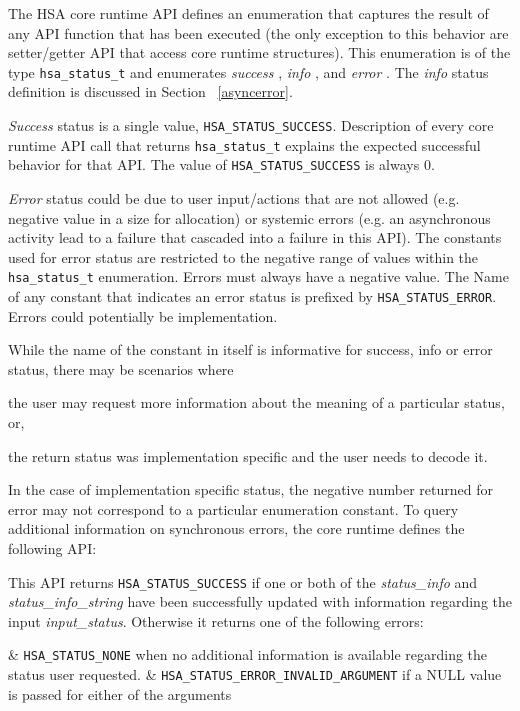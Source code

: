 \documentclass{book}
\newcommand{\diffblock}[1]{#1}
\newcommand{\emphld}[1]{\begin{DIFnomarkup} \emph{#1}
\end{DIFnomarkup}}
\newcommand{\dbtt}[1]{\diffblock{\texttt{#1}}}
\newenvironment{DIFnomarkup}{}{}
\begin{document}
The HSA core runtime API defines an enumeration that captures the
result of any API function that has been executed (the only
exception to this behavior are setter/getter API that access core
runtime structures). This enumeration is of the type
\dbtt{hsa\_status\_t} and enumerates \emphld{success},
\emphld{info}, and \emphld{error}. The \emphld{info} status definition
is discussed in Section ~\ref{asyncerror}.

\emphld{Success} status is a single value,
\dbtt{HSA\_STATUS\_SUCCESS}. Description of every core runtime
API call that returns \dbtt{hsa\_status\_t} explains the
expected successful behavior for that API. The value of
\dbtt{HSA\_STATUS\_SUCCESS} is always 0.

\emphld{Error} status could be due to user input/actions that are not
allowed (e.g. negative value in a size for allocation) or systemic
errors (e.g. an asynchronous activity lead to a failure that
cascaded into a failure in this API). The constants used for error
status are restricted to the negative range of values within the
\dbtt{hsa\_status\_t} enumeration. Errors must always have a
negative value. The Name of any constant that indicates an error status is
prefixed by \dbtt{HSA\_STATUS\_ERROR}. Errors could potentially be
implementation.

While the name of the constant in itself is informative for success,
info or error status, there may be scenarios where
\begin{inparaenum}[(i)] \item the user may request more information
about the meaning of a particular status, or, \item the return
status was implementation specific and the user needs to decode it.
\end{inparaenum} In the case of implementation specific status, the
negative number returned for error may not correspond to a
particular enumeration constant. To query additional
information on synchronous errors, the core runtime defines the
following API:



This API returns \dbtt{HSA\_STATUS\_SUCCESS} if one or both of the
{\itshape status\_info} and {\itshape status\_info\_string} have been
successfully updated with information regarding the input
{\itshape input\_status}. Otherwise it returns one of the following errors:

\begin{easylist}
& \dbtt{HSA\_STATUS\_NONE} when no additional information is
available regarding the status user requested.
& \dbtt{HSA\_STATUS\_ERROR\_INVALID\_ARGUMENT} if a NULL value is
passed for either of the arguments
\end{easylist}
\end{document}
